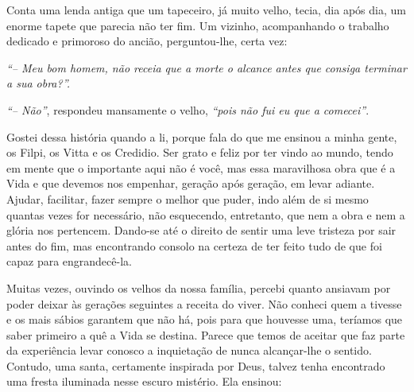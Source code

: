 Conta uma lenda antiga que um tapeceiro, já muito velho, tecia, dia após dia, um enorme tapete que parecia não ter fim.
Um vizinho, acompanhando o trabalho dedicado e primoroso do ancião, perguntou-lhe, certa vez:

\textit{``-- Meu bom homem, não receia que a morte o alcance antes que consiga terminar a sua obra?''.}

\textit{``-- Não''}, respondeu mansamente o velho,\textit{ ``pois não fui eu que a comecei''}.

Gostei dessa história quando a li, porque fala do que me ensinou a minha gente, os Filpi, os Vitta e os Credidio.
Ser grato e feliz por ter vindo ao mundo, tendo em mente que o importante aqui não é você, mas essa maravilhosa obra que é a Vida e que devemos nos empenhar, geração após geração, em levar adiante.
Ajudar, facilitar, fazer sempre o melhor que puder, indo além de si mesmo quantas vezes for necessário, não esquecendo, entretanto, que nem a obra e nem a glória nos pertencem.
Dando-se até o direito de sentir uma leve tristeza por sair antes do fim, mas encontrando consolo na certeza de ter feito tudo de que foi capaz para engrandecê-la.

Muitas vezes, ouvindo os velhos da nossa família, percebi quanto ansiavam por poder deixar às gerações seguintes a receita do viver.
 Não conheci quem a tivesse e os mais sábios garantem que não há, pois para que houvesse uma, teríamos que saber primeiro a quê a Vida se destina.
Parece que temos de aceitar que faz parte da experiência levar conosco a inquietação de nunca alcançar-lhe o sentido.
Contudo, uma santa, certamente inspirada por Deus, talvez tenha encontrado uma fresta iluminada nesse escuro mistério. Ela ensinou:

\vfill


